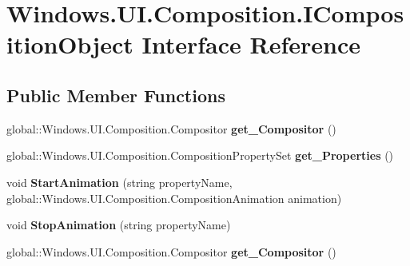 \hypertarget{interface_windows_1_1_u_i_1_1_composition_1_1_i_composition_object}{}\section{Windows.\+U\+I.\+Composition.\+I\+Composition\+Object Interface Reference}
\label{interface_windows_1_1_u_i_1_1_composition_1_1_i_composition_object}
\subsection*{Public Member Functions}
\begin{DoxyCompactItemize}
\item 
\mbox{\label{interface_windows_1_1_u_i_1_1_composition_1_1_i_composition_object_a61c8be4943d7e05e28090025b57637b8}} 
global\+::\+Windows.\+U\+I.\+Composition.\+Compositor {\bfseries get\+\_\+\+Compositor} ()
\item 
\mbox{\label{interface_windows_1_1_u_i_1_1_composition_1_1_i_composition_object_a8b4cd5d3437e00c9e5b1e2533c068496}} 
global\+::\+Windows.\+U\+I.\+Composition.\+Composition\+Property\+Set {\bfseries get\+\_\+\+Properties} ()
\item 
\mbox{\label{interface_windows_1_1_u_i_1_1_composition_1_1_i_composition_object_a088c63d6d52d35264dd7c45af14b2c2b}} 
void {\bfseries Start\+Animation} (string property\+Name, global\+::\+Windows.\+U\+I.\+Composition.\+Composition\+Animation animation)
\item 
\mbox{\label{interface_windows_1_1_u_i_1_1_composition_1_1_i_composition_object_a3e0870776b613990ed3b7aeb31408e88}} 
void {\bfseries Stop\+Animation} (string property\+Name)
\item 
\mbox{\label{interface_windows_1_1_u_i_1_1_composition_1_1_i_composition_object_a61c8be4943d7e05e28090025b57637b8}} 
global\+::\+Windows.\+U\+I.\+Composition.\+Compositor {\bfseries get\+\_\+\+Compositor} ()

\end{DoxyCompactItemize}
